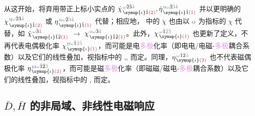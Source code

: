从这开始，将弃用带正上标小实点的 $\dot{\chi}^{\;\! \mathcolor{gray}{\omega} \hat{2} \hat{3} \mathcolor{gray}{\hat{4}}}_{\;\! \symup{\iota} \hat{1} \textcolor{Maroon}{(2)}}, \dot{\eta}^{\;\! \textcolor{NavyBlue}{\text{n}} \mathcolor{gray}{\omega} \hat{2} \mathcolor{gray}{\hat{3} \hat{4}}}_{\;\! \symup{\iota} \hat{1} \textcolor{Maroon}{(1)}}$ 并以更明确的 $\chi^{\;\! \textcolor{NavyBlue}{\text{q}} \mathcolor{gray}{\omega} \hat{2} \hat{3} \mathcolor{gray}{\hat{4}}}_{\;\! \symup{\iota} \hat{1} \textcolor{Maroon}{(2)}}$ 或 $\eta^{\;\! \textcolor{NavyBlue}{\text{n}} \mathcolor{gray}{\omega} \hat{2} \mathcolor{gray}{\hat{3} \hat{4}}}_{\;\! \symup{\iota} \hat{1} \textcolor{Maroon}{(1)}}$ 代替；相应地， 中的 $\ddot{\chi}$ 也由以 $\textcolor{NavyBlue}{\text{o}}$ 为指标的 $\chi$ 代替，如 $\ddot{\chi}^{\;\! \mathcolor{gray}{\omega} \hat{3} \mathcolor{gray}{\hat{4}}}_{\;\! \symup{\iota} \hat{1} \hat{2} \textcolor{Maroon}{(1)}}$ $\longrightarrow$ $\chi^{\;\! \textcolor{NavyBlue}{\text{o}} \mathcolor{gray}{\omega} \hat{3} \mathcolor{gray}{\hat{4}}}_{\;\! \symup{\iota} \hat{1} \hat{2} \textcolor{Maroon}{(1)}}$。此外，$\chi^{\;\! \mathcolor{gray}{\omega} \hat{1} \mathcolor{gray}{\hat{2} \hat{3}}}_{\;\! \symup{\iota} \textcolor{Maroon}{(1)}}$ 也更新了定义，不再代表电偶极化率 $\chi^{\;\! \textcolor{NavyBlue}{\text{p}} \mathcolor{gray}{\omega} \hat{1} \mathcolor{gray}{\hat{2} \hat{3}}}_{\;\! \symup{\iota} \textcolor{Maroon}{(1)}}$，而可能是电\textcolor{Plum}{多极}化率（即电电/电磁-\textcolor{Plum}{多极}耦合系数）以及它们的\textcolor{PineGreen}{线性叠加}，视指标中的 \textcolor{NavyBlue}{},\textcolor{NavyBlue}{},\textcolor{NavyBlue}{} 而定。同理，$\eta^{\;\! \mathcolor{gray}{\omega} \hat{1} \hat{2} \mathcolor{gray}{\hat{3}}}_{\;\! \symup{\iota} \textcolor{Maroon}{(2)}}$ 也不代表磁偶极化率 $\eta^{\;\! \textcolor{NavyBlue}{\text{m}} \mathcolor{gray}{\omega} \hat{1} \hat{2} \mathcolor{gray}{\hat{3}}}_{\;\! \symup{\iota} \textcolor{Maroon}{(2)}}$，而可能是磁\textcolor{Plum}{多极}化率（即磁磁/磁电-\textcolor{Plum}{多极}耦合系数）以及它们的\textcolor{PineGreen}{线性叠加}，视指标中的 \textcolor{NavyBlue}{},\textcolor{NavyBlue}{} 而定。

\vspace*{-4.0em}

\subsection{$\bar{D},\bar{H}$ 的非局域、非线性电磁响应}\label{ssec:DH-nonlinear}

